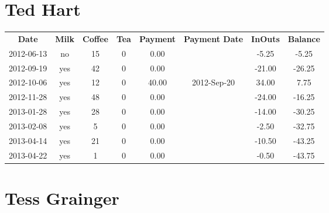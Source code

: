 \section{Ted Hart}

\begin{center}
\begin{tabular}{cccccccc}
\textbf{Date} & \textbf{Milk} & \textbf{Coffee} & \textbf{Tea} & \textbf{Payment} & \textbf{Payment Date} & \textbf{InOuts} & \textbf{Balance} \\
2012-06-13 & no & 15 & 0 &  0.00 &  &  -5.25 &  -5.25\\ 
2012-09-19 & yes & 42 & 0 &  0.00 &  & -21.00 & -26.25\\ 
2012-10-06 & yes & 12 & 0 & 40.00 & 2012-Sep-20 &  34.00 &   7.75\\ 
2012-11-28 & yes & 48 & 0 &  0.00 &  & -24.00 & -16.25\\ 
2013-01-28 & yes & 28 & 0 &  0.00 &  & -14.00 & -30.25\\ 
2013-02-08 & yes &  5 & 0 &  0.00 &  &  -2.50 & -32.75\\ 
2013-04-14 & yes & 21 & 0 &  0.00 &  & -10.50 & -43.25\\ 
2013-04-22 & yes &  1 & 0 &  0.00 &  &  -0.50 & -43.75
\end{tabular}
\end{center}

\section{Tess Grainger}

